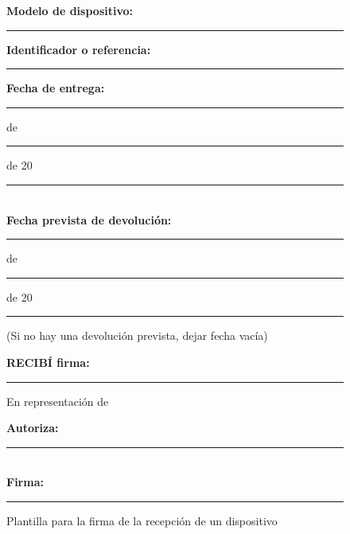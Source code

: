 \begin{figure}[htbp]
{      \noindent \textbf{Modelo de dispositivo:} \rule{6.5cm}{0.4pt} \hfill

      \textbf{Identificador o referencia:} \rule{6.5cm}{0.4pt}

      \vspace{1em}

      \noindent \textbf{Fecha de entrega:} \rule{1cm}{0.4pt} de \rule{2cm}{0.4pt} de 20\rule{1cm}{0.4pt} \\

      \noindent \textbf{Fecha prevista de devolución:} \rule{1cm}{0.4pt} de \rule{2cm}{0.4pt} de 20\rule{1cm}{0.4pt}

      (Si no hay una devolución prevista, dejar fecha vacía)

      \vspace{3em}

      \noindent \textbf{RECIBÍ firma:} \rule{10cm}{0.4pt}

      \vspace{3em}

      En representación de \Beneficiario

      \noindent \textbf{Autoriza:} \rule{5cm}{0.4pt}  \\
      \textbf{Firma:} \rule{6cm}{0.4pt}

      \vfill
    }
    \caption{Plantilla para la firma de la recepción de un dispositivo}
    \label{tab:guia-sgsi-plantilla-firma-recepcion-dispositivo}
\end{figure}